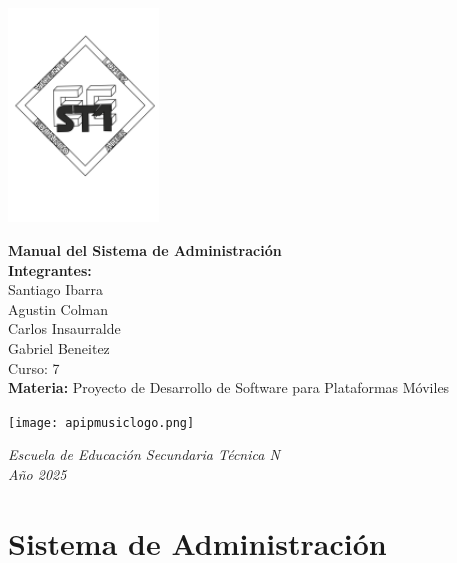 \documentclass[a4paper,12pt]{article}
\begin{document}
\begin{flushright}
    \includegraphics[width=4cm]{LOGO-EEST1.png}
\end{flushright}

\vspace*{2cm}

\begin{center}
    {\LARGE\bfseries Manual del Sistema de Administración} \\[1.5cm]
    \textbf{Integrantes:} \\[0.3cm]
    Santiago Ibarra \\[0.2cm]
    Agustin Colman \\[0.2cm]
    Carlos Insaurralde \\[0.2cm]
    Gabriel Beneitez \\[1.2cm]
    Curso: 7 \\
    \vspace{0.5cm}
    \textbf{Materia:} Proyecto de Desarrollo de Software para Plataformas Móviles
    
    \vspace{0.7cm}
    \texttt{[image: apipmusiclogo.png]}\\[0.5cm]
\end{center}

\vfill

\begin{center}
    \textit{Escuela de Educación Secundaria Técnica N} \\
    \textit{Año 2025}
\end{center}

\thispagestyle{empty}
\newpage

\tableofcontents
\newpage

\section{Sistema de Administración}
\end{document}
